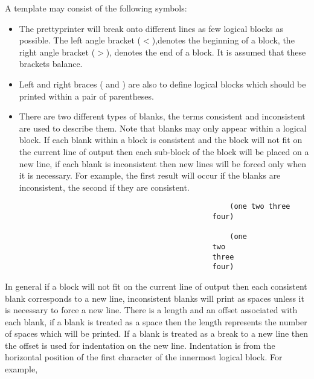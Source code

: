   A template may consist of the following symbols:
\begin{itemize}

\item The prettyprinter will break onto different  lines  as 
      few logical blocks as possible. The left angle bracket
						($<$),denotes the beginning of a block, the right angle
						bracket ($>$), denotes the end of a block. It is assumed 
						that these brackets balance.

\item Left  and right braces ({ and }) are also to define 
						logical blocks which should be printed within a pair 
						of parentheses.

\item There are two different types of blanks, the terms
      consistent and inconsistent  are  used  to  describe them.
      Note  that  blanks  may only appear within a logical block.
     	If each blank within a block is consistent  and  the  block
     	will  not  fit  on  the  current  line  of output then each
     	sub-block of the block will be placed on  a  new  line,  if
     	each  blank  is  inconsistent then new lines will be forced
     	only when it is necessary.  For example, the  first  result
     	will  occur  if  the blanks are inconsistent, the second if
     	they are consistent.
\end{itemize}

\begin{verbatim}
     												(one two three
      											four)

     												(one
      											two
      											three
      											four) 
\end{verbatim}

    In general if a block will not fit  on  the  current
     line  of output then each consistent blank corresponds to a
     new line, inconsistent blanks will print as  spaces  unless
     it  is necessary to force a new line. There is a length and
     an offset associated with each blank, if a blank is treated
     as a space then the length represents the number of  spaces
     which  will be printed. If a blank is treated as a break to
     a new line then the offset is used for indentation  on  the
     new  line.  Indentation  is from the horizontal position of
     the first character of the innermost logical  block.    For
     example,

